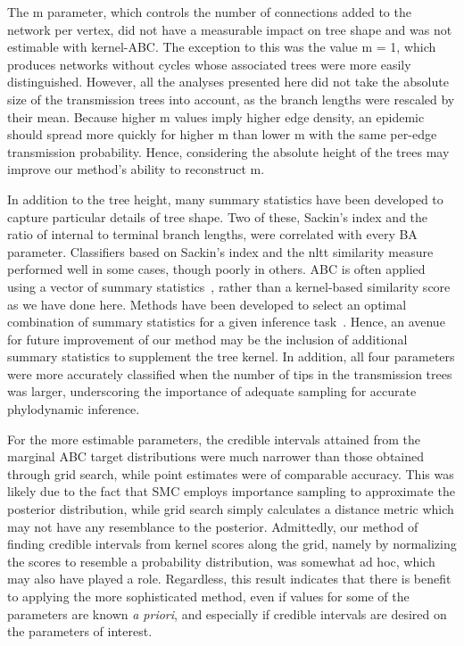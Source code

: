 The \gls{m} parameter, which controls the number of connections added to the
network per vertex, did not have a measurable impact on tree shape and was not
estimable with kernel-ABC. The exception to this was the value \gls{m} = 1,
which produces networks without cycles whose associated trees were more easily
distinguished. However, all the analyses presented here did not take the
absolute size of the transmission trees into account, as the branch lengths
were rescaled by their mean. Because higher \gls{m} values imply higher edge
density, an epidemic should spread more quickly for higher \gls{m} than lower
\gls{m} with the same per-edge transmission probability.  Hence, considering
the absolute height of the trees may improve our method's ability to
reconstruct \gls{m}.

In addition to the tree height, many summary statistics have been developed to
capture particular details of tree shape. Two of these, Sackin's index and the
ratio of internal to terminal branch lengths, were correlated with every
\gls{BA} parameter. Classifiers based on Sackin's index and the \gls{nltt}
similarity measure performed well in some cases, though poorly in others.
\gls{ABC} is often applied using a vector of summary
statistics~\autocite{marin2012approximate, sunnaaker2013approximate}, rather
than a kernel-based similarity score as we have done here. Methods have been
developed to select an optimal combination of summary statistics for a given
inference task~\autocite{fearnhead2012constructing}. Hence, an avenue for
future improvement of our method may be the inclusion of additional summary
statistics to supplement the tree kernel. In addition, all four parameters were
more accurately classified when the number of tips in the transmission trees
was larger, underscoring the importance of adequate sampling for accurate
phylodynamic inference.

For the more estimable parameters, the credible intervals attained from the
marginal \gls{ABC} target distributions were much narrower than those obtained
through grid search, while point estimates were of comparable accuracy. This
was likely due to the fact that \gls{SMC} employs importance sampling to
approximate the posterior distribution, while grid search simply calculates a
distance metric which may not have any resemblance to the posterior.
Admittedly, our method of finding credible intervals from kernel scores along
the grid, namely by normalizing the scores to resemble a probability
distribution, was somewhat ad hoc, which may also have played a role.
Regardless, this result indicates that there is benefit to applying the more
sophisticated method, even if values for some of the parameters are known
\textit{a priori}, and especially if credible intervals are desired on the
parameters of interest.


